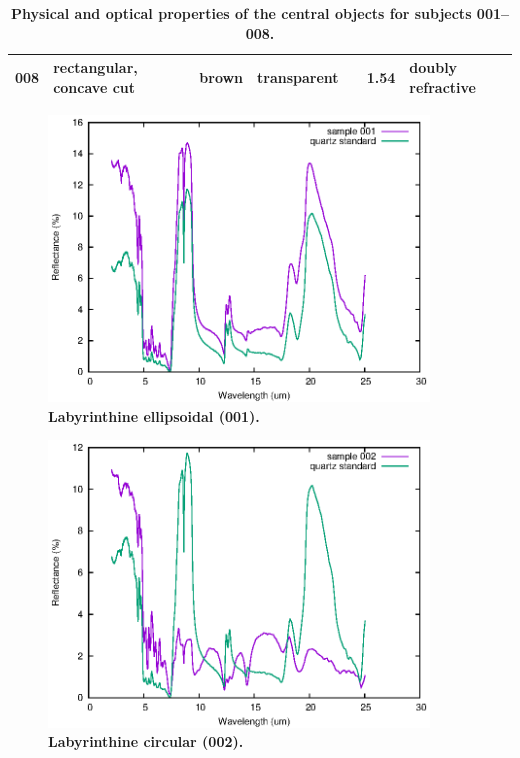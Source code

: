 \documentclass[10pt]{article}
\theoremstyle{definition}
\begin{document}
\begin{table}[h]
{\begin{tabular}{lp{5em}rrrrp{7.5em}}
\textbf{008}                                & rectangular, concave cut           & brown                                      & transparent                               &  & 1.54                                          & doubly refractive                            \\ \hline
\end{tabular}}
\caption{\label{tab:gem_properties}\textbf{Physical and optical properties of the central objects for subjects 001--008.}}
\end{table}

\begin{figure}
\centering
  \includegraphics[angle=0,width=0.9\textwidth]{001.eps}
\caption{\label{fig:001}\textbf{Labyrinthine ellipsoidal (001).}}
\end{figure}

\begin{figure}
  \includegraphics[angle=0,width=0.9\textwidth]{002.eps}
\caption{\label{fig:002}\textbf{Labyrinthine circular (002).}}
\end{figure}
\end{document}
